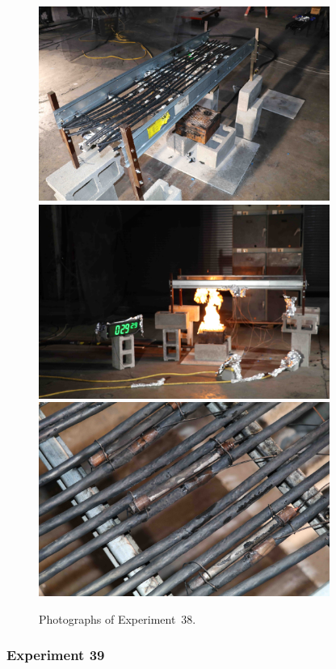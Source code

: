 \begin{figure}[p]
\centering
\includegraphics[height=2.50in]{../FIGURES/Test_38_setup} \\
\includegraphics[height=2.50in]{../FIGURES/Test_38_29_min_29_s} \\
\includegraphics[height=2.50in]{../FIGURES/Test_38_damage}
\caption[Photographs of Experiment~38]{Photographs of Experiment~38.}
\label{fig:Test_38_photos}
\end{figure}


\clearpage

\subsubsection{Experiment 39}

